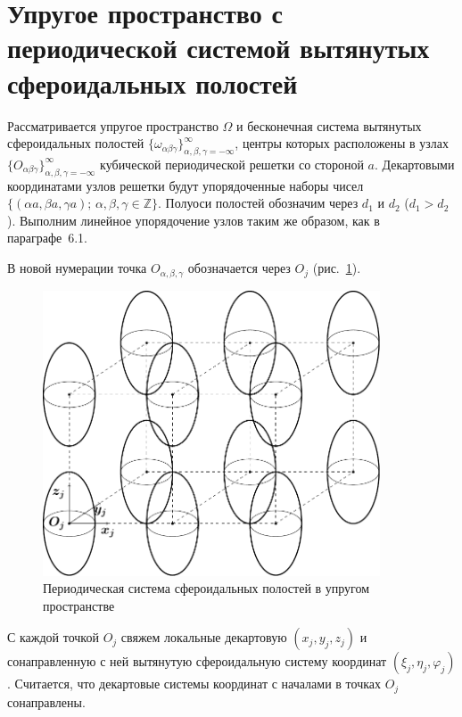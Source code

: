 
\section[Упругое пространство с периодической системой вытянутых сфероидальных полостей]{Упругое пространство с периодической системой вытянутых сфероидальных полостей}

Рассматривается упругое пространство $\Omega$ и бесконечная система вытянутых сфероидальных полостей $\{\omega_{\alpha\beta\gamma}\}_{\alpha,\beta,\gamma=-\infty}^\infty$, центры которых расположены в узлах $\{O_{\alpha\beta\gamma}\}_{\alpha,\beta,\gamma=-\infty}^\infty$ кубической периодической решетки со стороной $a$. Декартовыми координатами узлов решетки будут упорядоченные наборы чисел $\{(\alpha a,\beta a,\gamma a);\,\alpha,\beta,\gamma\in\mathbb{Z}\}$. Полуоси полостей обозначим через $d_1$ и $d_2$ ($d_1>d_2$). Выполним линейное упорядочение узлов таким же образом, как в параграфе~6.1.\sloppy

В новой нумерации точка $O_{\alpha,\beta,\gamma}$ обозначается через $O_j$ (рис.~\ref{f:11:1a}).

\begin{figure}[h!]
\centering
\includegraphics[width=10cm]{cartesian-spheroids-periodic.pdf}
\caption{Периодическая система сфероидальных полостей в упругом пространстве}
\label{f:11:1a}
\end{figure}

С каждой точкой $O_j$ свяжем локальные декартовую $(x_j,y_j,z_j)$ и сонаправленную с ней вытянутую сфероидальную систему координат $(\xi_j,\eta_j,\varphi_j)$. Считается, что декартовые системы координат с началами в точках $O_j$ сонаправлены.

